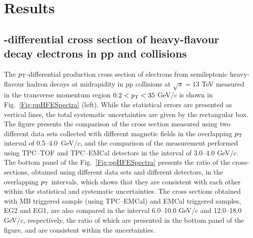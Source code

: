 \section{Results}\label{section:results}

\subsection{\pt-differential cross section of heavy-flavour decay electrons in pp and \pPb collisions}
The $p_{\rm{T}}$-differential production cross section of electrons from semileptonic heavy-flavour hadron decays at midrapidity
in pp collisions at $\sqrt{s} = 13$ TeV measured in the transverse momentum region $0.2 < p_{\rm{T}} < 35$ GeV$/c$ is shown in Fig.~\ref{Fig:ppHFESpectra} (left). While the statistical errors are presented as vertical lines, the total systematic uncertainties are given by the rectangular box. The figure  presents the comparison of the cross section measured using two different data sets collected with different magnetic fields in the overlapping $p_{\rm{T}}$ interval of 0.5--4.0~GeV$/c$, and the comparison of the measurement performed using TPC--TOF and TPC--EMCal detectors in the interval of 3.0--4.0 GeV$/c$. The bottom panel of the Fig.~\ref{Fig:ppHFESpectra} presents the ratio of the cross-sections, obtained using different data sets and different detectors, in the overlapping $p_{\rm{T}}$ intervals, which shows that they are consistent with each other within the statistical and systematic uncertainties. 
The cross sections obtained with MB triggered sample (using TPC--EMCal) and EMCal triggered samples, EG2 and EG1, are also compared in the interval 6.0--10.0 GeV$/c$ and 12.0--18.0 GeV$/c$, respectively, the ratio of which are presented in the bottom panel of the figure, and are consistent within the uncertainties.  

